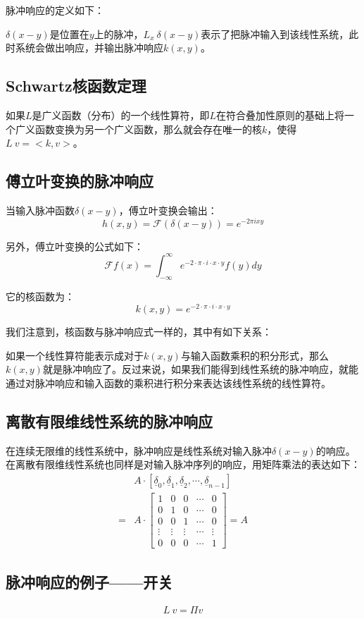 脉冲响应的定义如下：

$\delta(x−y)$是位置在$y$上的脉冲，$L_x\ \delta(x−y)$表示了把脉冲输入到该线性系统，此时系统会做出响应，并输出脉冲响应$k(x,y)$。
\subsection{Schwartz核函数定理}
如果$L$是广义函数（分布）的一个线性算符，即$L$在符合叠加性原则的基础上将一个广义函数变换为另一个广义函数，那么就会存在唯一的核$k$，使得$L\ v=<k,v>$。
\subsection{傅立叶变换的脉冲响应}
当输入脉冲函数$\delta(x-y)$，傅立叶变换会输出：
$$
	h(x,y) = \mathcal{F}(\delta(x-y)) = e^{-2\pi ixy}
$$

另外，傅立叶变换的公式如下：
$$
	\mathcal{F}f(x) =  \int_{-\infty}^{\infty}e^{-2\cdot \pi\cdot  i\cdot x\cdot y}f(y)dy
$$

它的核函数为：
$$
	k(x,y) = e^{-2\cdot \pi\cdot  i\cdot x\cdot y}
$$

我们注意到，核函数与脉冲响应式一样的，其中有如下关系：

如果一个线性算符能表示成对于$k(x,y)$与输入函数乘积的积分形式，那么$k(x,y)$就是脉冲响应了。反过来说，如果我们能得到线性系统的脉冲响应，就能通过对脉冲响应和输入函数的乘积进行积分来表达该线性系统的线性算符。

\subsection{离散有限维线性系统的脉冲响应}
在连续无限维的线性系统中，脉冲响应是线性系统对输入脉冲$\delta(x-y)$的响应。在离散有限维线性系统也同样是对输入脉冲序列的响应，用矩阵乘法的表达如下：
\begin{align*}
	  & A\cdot \left[ \underline{\delta}_0,\underline{\delta}_1,\underline{\delta}_2,\cdots ,\underline{\delta}_{n-1} \right] \\
	= & A\cdot\begin{bmatrix} 1 &0  &0  &\cdots   &0 \\  0 &1  &0  &\cdots   &0 \\  0 &0  &1  &\cdots   &0 \\  \vdots &\vdots  &\vdots  &\cdots   &\vdots \\  0 &0  &0  &\cdots   &1  \end{bmatrix}=A
\end{align*}
\subsection{脉冲响应的例子——开关}
\begin{align*}
	L\ v = \Pi v
\end{align*}

